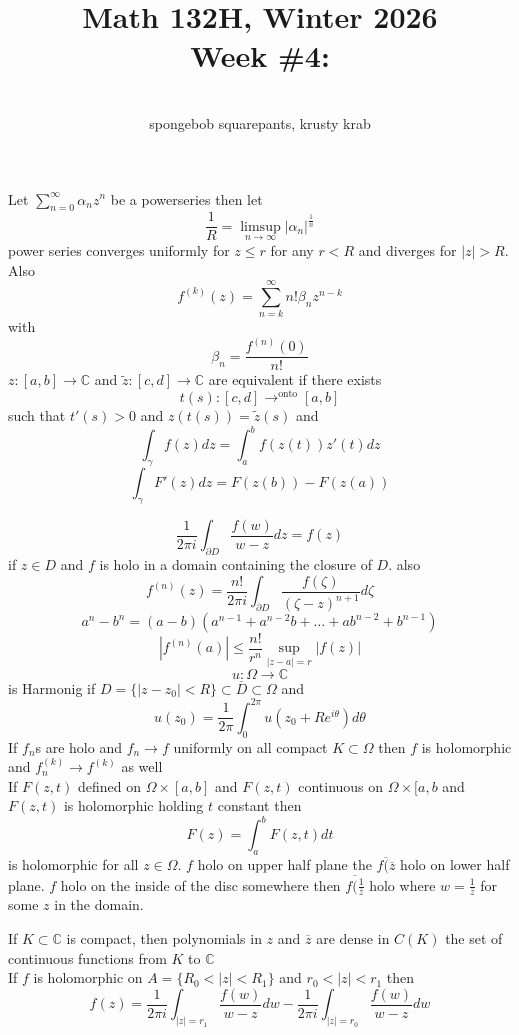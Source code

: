 \documentclass[11pt]{article}
\newcommand{\cnum}{Math 132H}
\newcommand{\ced}{Winter 2026}
\newcommand{\ctitle}[4]{\title{\vspace{-0.5in}\cnum, \ced\\Week #1: #2}\author{\vspace{-0.35in}\\#3, #4}}
\begin{document}
\ctitle{\#4}{}{spongebob squarepants}{krusty krab}
\date{}
\maketitle

Let $\sum_{n=0}^{\infty}\alpha_nz^{n}$ be a powerseries then 
let
\[
\frac{1}{R} = \limsup_{n\to \infty}|\alpha_n|^{\frac{1}{n}}
\] 
power series converges uniformly for $z \le r$ for any  $r < R$ and diverges for  $|z| > R$.
Also
 \[
f^{(k)}(z) = \sum_{n=k}^{\infty}n!\beta_n z^{n-k}
\] 
with
\[
\beta_n = \frac{f^{(n)}(0)}{n!}
\] 
$z : [a,b] \to \mathbb{C}$ and $\tilde z : [c,d] \to \mathbb{C}$ are equivalent if there exists
\[
    t(s) : [c,d] \to^{\text{onto}} [a,b]
\] 
such that $t'(s) > 0$ and  $z(t(s)) = \tilde z(s)$
and
 \[
\int_{\gamma}^{}f(z)dz = \int_{a}^{b}f(z(t))z'(t)dz
\] 
\[
\int_{\gamma}^{}F'(z)dz = F(z(b)) - F(z(a))
\] 

\[
\frac{1}{2\pi i} \int_{\partial D}^{} \frac{f(w)}{w-z}dz = f(z)
\] 
if $z \in D$ and  $f$ is holo in a domain containing the closure of $D$.
also
\[
f^{(n)}(z) = \frac{n!}{2\pi i} \int_{ \partial D}^{}\frac{f(\zeta)}{(\zeta - z)^{n+1}}d \zeta
\] 
\[
    a^{n} - b^{n} = (a-b)(a^{n-1} + a^{n-2}b +\dots + ab^{n-2} + b^{n-1})
\] 
\[
    |f^{(n)}(a)| \le \frac{n!}{r^{n}}\sup_{|z-a|= r}|f(z)|
\] 
\[
u : \Omega \to \mathbb{C}
\] 
is Harmonig if $D = \{|z-z_0| < R\} \subset \overline{ D} \subset \Omega$ and
\[
u(z_0) = \frac{1}{2\pi} \int_{0}^{2\pi} u(z_0 + Re^{ i \theta}) d \theta
\] 
If $f_n$s are holo and $f_n \to f$ uniformly on all compact  $K \subset \Omega$ then $f$ is holomorphic and $f_n^{(k)} \to f^{(k)}$ as well\\
If $F(z,t) $ defined on $\Omega \times [a,b]$ and  $F(z,t)$ continuous on  $\Omega \times [a,b$
and  $F(z,t)$ is holomorphic holding  $t$ constant then 
\[
F(z) = \int_{a}^{b}F(z,t)dt
\] 
is holomorphic for all $z \in \Omega$.
 $f$ holo on upper half plane the  $\overline{f(\overline{z}}$ holo on lower half plane. $f$ holo on the inside of the disc somewhere then $\overline{f(\frac{1}{\overline{ z}}}$ holo where $w = \frac{1}{ \overline{ z}} $ for some $z$ in the domain.

If  $K \subset \mathbb{C}$ is compact, then polynomials in $z$ and $\overline{ z}$ are dense in $ C(K)$ the set of continuous functions from  $K $ to  $ \mathbb{C}$\\
If $f$ is holomorphic on $A = \{ R_0 < |z| < R_1\}$  and $r_0 < |z| < r_1$ then
\[
f(z) = \frac{1}{2\pi i} \int_{|z| = r_1}^{} \frac{f(w)}{w-z}dw - \frac{1}{2\pi i}\int_{|z| = r_0}^{}\frac{f(w)}{w-z}dw
\] 
\end{document}
